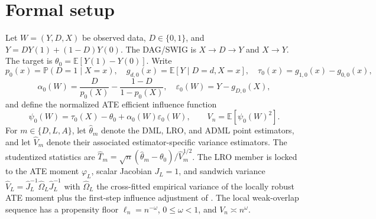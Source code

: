 \documentclass[11pt]{article}
\newcommand{\E}{\mathbb{E}}
\renewcommand{\Pr}{\mathbb{P}}
\theoremstyle{definition}
\theoremstyle{plain}
\theoremstyle{remark}
\begin{document}
\section{Formal setup}
Let \(W=(Y,D,X)\) be observed data, \(D\in\{0,1\}\), and \(Y=DY(1)+(1-D)Y(0)\).
The DAG/SWIG is \(X\to D\to Y\) and \(X\to Y\).  The target is
\(\theta_0=\E[Y(1)-Y(0)]\).  Write
\[
  p_0(x)=\Pr(D=1\mid X=x),\quad
  g_{d,0}(x)=\E[Y\mid D=d,X=x],\quad
  \tau_0(x)=g_{1,0}(x)-g_{0,0}(x),
\]
\[
  \alpha_0(W)=\frac{D}{p_0(X)}-\frac{1-D}{1-p_0(X)},\quad
  \varepsilon_0(W)=Y-g_{D,0}(X),
\]
and define the normalized ATE efficient influence function
\[
  \psi_0(W)=\tau_0(X)-\theta_0+\alpha_0(W)\varepsilon_0(W),\qquad
  V_n=\E[\psi_0(W)^2].
\]
For \(m\in\{D,L,A\}\), let \(\widehat\theta_m\) denote the DML, LRO, and ADML
point estimators, and let \(\widehat V_m\) denote their associated
estimator-specific variance estimators.  The studentized statistics are
\(\widehat T_m=\sqrt n(\widehat\theta_m-\theta_0)/\widehat V_m^{1/2}\).
The LRO member is locked to the ATE moment \(\varphi_L\), scalar Jacobian
\(J_L=1\), and sandwich variance
\(\widehat V_L=\widehat J_L^{-1}\widehat\Omega_L\widehat J_L^{-1}\) with
\(\widehat\Omega_L\) the cross-fitted empirical variance of the locally robust
ATE moment plus the first-step influence adjustment of
\citet{ChernozhukovEscancianoIchimuraNeweyRobins2022LRO}.
The local weak-overlap sequence has a propensity floor
\(\ell_n=n^{-\omega}\), \(0\le\omega<1\), and \(V_n\asymp n^\omega\).
\end{document}
